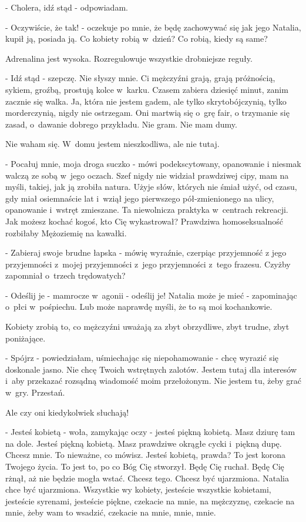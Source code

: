 \documentclass[oneside,polish,12pt,sfheadings]{mwbk}
\begin{document}
- Cholera, idź stąd - odpowiadam.

- Oczywiście, że tak! - oczekuje po mnie, że będę zachowywać się jak
jego Natalia, kupił ją, posiada ją. Co kobiety robią w~dzień? Co robią,
kiedy są same?

Adrenalina jest wysoka. Rozregulowuje wszystkie drobniejsze reguły.

- Idź stąd - szepczę. Nie słyszy mnie. Ci mężczyźni grają, grają próżnością,
sykiem, groźbą, prostują kolce w~karku. Czasem zabiera dziesięć minut,
zanim zacznie się walka. Ja, która nie jestem gadem, ale tylko skrytobójczynią,
tylko morderczynią, nigdy nie ostrzegam. Oni martwią się o~grę fair,
o trzymanie się zasad, o~dawanie dobrego przykładu. Nie gram. Nie
mam dumy.

Nie waham się. W~domu jestem nieszkodliwa, ale nie tutaj.

- Pocałuj mnie, moja droga suczko - mówi podekscytowany, opanowanie
i niesmak walczą ze sobą w~jego oczach. Szef nigdy nie widział prawdziwej
cipy, mam na myśli, takiej, jak ją zrobiła natura. Użyje słów, których
nie śmiał użyć, od czasu, gdy miał osiemnaście lat i~wziął jego pierwszego
pół-zmienionego na ulicy, opanowanie i~wstręt zmieszane. Ta niewolnicza
praktyka w~centrach rekreacji. Jak możesz kochać kogoś, kto Cię wykastrował?
Prawdziwa homoseksualność rozbiłaby Mężoziemię na kawałki.

- Zabieraj swoje brudne łapska - mówię wyraźnie, czerpiąc przyjemność
z jego przyjemności z~mojej przyjemności z~jego przyjemności z~tego
frazesu. Czyżby zapomniał o~trzech trędowatych?

- Odeślij je - mamrocze w~agonii - odeślij je! Natalia może je mieć
- zapominając o~płci w~pośpiechu. Lub może naprawdę myśli, że to są
moi kochankowie.

Kobiety zrobią to, co mężczyźni uważają za zbyt obrzydliwe, zbyt trudne,
zbyt poniżające.

- Spójrz - powiedziałam, uśmiechając się niepohamowanie - chcę wyrazić
się doskonale jasno. Nie chcę Twoich wstrętnych zalotów. Jestem tutaj
dla interesów i~aby przekazać rozsądną wiadomość moim przełożonym.
Nie jestem tu, żeby grać w~gry. Przestań.

Ale czy oni kiedykolwiek słuchają!

- Jesteś kobietą - woła, zamykając oczy - jesteś piękną kobietą. Masz
dziurę tam na dole. Jesteś piękną kobietą. Masz prawdziwe okrągłe
cycki i~piękną dupę. Chcesz mnie. To nieważne, co mówisz. Jesteś kobietą,
prawda? To jest korona Twojego życia. To jest to, po co Bóg Cię stworzył.
Będę Cię ruchał. Będę Cię rżnął, aż nie będzie mogła wstać. Chcesz
tego. Chcesz być ujarzmiona. Natalia chce być ujarzmiona. Wszystkie
wy kobiety, jesteście wszystkie kobietami, jesteście syrenami, jesteście
piękne, czekacie na mnie, na mężczyznę, czekacie na mnie, żeby wam
to wsadzić, czekacie na mnie, mnie, mnie.
\end{document}
